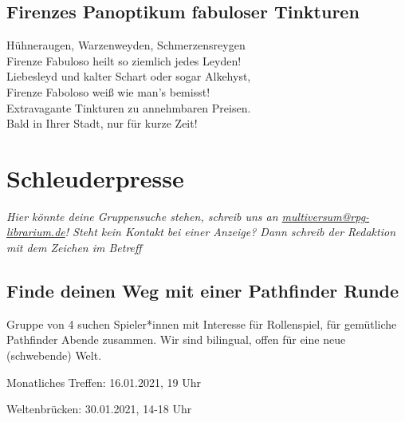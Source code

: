 \documentclass[final]{multiversum}
\begin{document}
\subsection{Firenzes Panoptikum fabuloser Tinkturen}
Hühneraugen, Warzenweyden, Schmerzensreygen\\
Firenze Fabuloso heilt so ziemlich jedes Leyden!\\
Liebesleyd und kalter Schart oder sogar Alkehyst,\\
Firenze Faboloso weiß wie man's bemisst!\\[1em]
Extravagante Tinkturen zu annehmbaren Preisen.\\
Bald in Ihrer Stadt, nur für kurze Zeit! 

\section{Schleuderpresse}
\textit{Hier könnte deine Gruppensuche stehen, schreib uns an \href{mailto:multiversum@rpg-librarium.de}{multiversum@rpg-librarium.de}! 
Steht kein Kontakt bei einer Anzeige? Dann schreib der Redaktion mit dem Zeichen im Betreff}

\subsection{Finde deinen Weg mit einer Pathfinder Runde}
Gruppe von 4 suchen Spieler*innen mit Interesse für Rollenspiel, für gemütliche Pathfinder Abende zusammen.
Wir sind bilingual, offen für eine neue (schwebende) Welt.

\begin{termine}
\item Monatliches Treffen: 16.01.2021, 19 Uhr
\item Weltenbrücken: 30.01.2021, 14-18 Uhr
\end{termine}
\impressum
\end{document}
